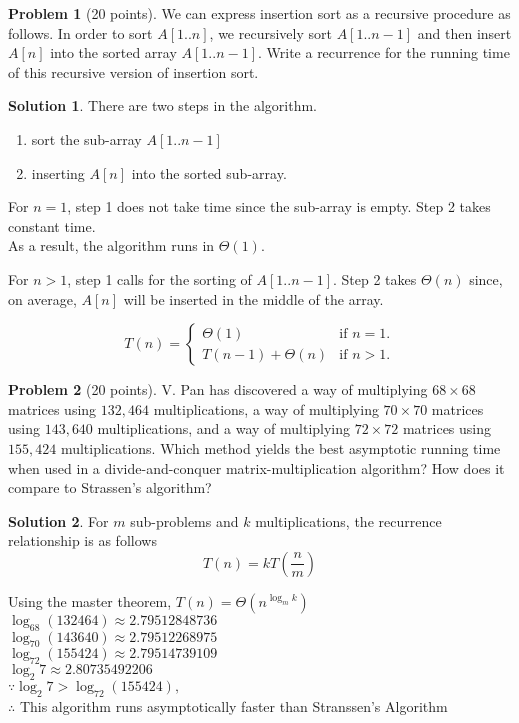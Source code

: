 \documentclass{article}
\theoremstyle{definition}
\newtheorem{problem}{Problem}
\newtheorem*{solution}{Solution}
\begin{document}
\begin{problem}[20 points]
  We can express insertion sort as a recursive procedure as follows. 
In order to sort $A[1..n]$, we recursively sort $A[1..n-1]$ and then
insert $A[n]$ into the sorted array $A[1..n-1]$. Write a recurrence for
the running time of this recursive version of insertion sort. 
\end{problem}
\begin{solution}
There are two steps in the algorithm.
\begin{enumerate}
    \item sort the sub-array $A[1..n-1]$
    \item inserting $A[n]$ into the sorted sub-array.
\end{enumerate}
For $n=1$, step 1 does not take time since the sub-array is empty. Step 2 takes constant time.\\
As a result, the algorithm runs in $\Theta(1)$.

\noindent
For $n>1$, step 1 calls for the sorting of $A[1..n-1]$. Step 2 takes $\Theta(n)$ since, on average, $A[n]$ will be inserted in the middle of the array.

\[T(n)=\begin{cases}
\Theta(1) & \text{if $n=1$.}\\
T(n-1)+\Theta(n) & \text{if $n>1$.}
\end{cases}\]
\end{solution}

\clearpage
\begin{problem}[20 points]
  V. Pan has discovered a way of multiplying $68 \times 68$ matrices
  using $132,464$ multiplications, a way of multiplying $70\times 70$
  matrices using $143,640$ multiplications, and a way of multiplying
  $72\times 72$ matrices using $155,424$ multiplications. Which method
  yields the best asymptotic running time when used in a
  divide-and-conquer matrix-multiplication algorithm? How does it
  compare to Strassen’s algorithm?
\end{problem}
\begin{solution}
For $m$ sub-problems and $k$ multiplications, the recurrence relationship is as follows
\[T(n)=kT\left(\frac{n}{m}\right)\]

\noindent
Using the master theorem, $T(n)=\Theta\left(n^{\log_{m}k}\right)$\\

\noindent
$\log_{68}(132464)\approx2.79512848736$\\
$\log_{70}(143640)\approx2.79512268975$\\
$\log_{72}(155424)\approx2.79514739109$\\
$\log_2{7}\approx2.80735492206$\\
$\because\log_2{7}>\log_{72}(155424),$\\
$\therefore$ This algorithm runs asymptotically faster than Stranssen's Algorithm
\end{solution}
\end{document}
